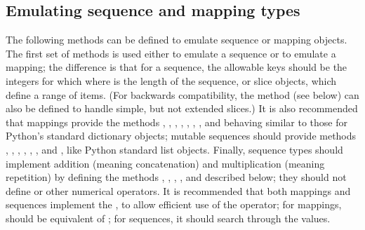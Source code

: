\subsection{Emulating sequence and mapping types\label{sequence-types}}

The following methods can be defined to emulate sequence or mapping
objects.  The first set of methods is used either to emulate a
sequence or to emulate a mapping; the difference is that for a
sequence, the allowable keys should be the integers  for which
 where  is the length of the
sequence, or slice objects, which define a range of items. (For backwards
compatibility, the method  (see below) can also be
defined to handle simple, but not extended slices.) It is also recommended
that mappings provide the methods , ,
, , , ,
, and  behaving similar to those for
Python's standard dictionary objects; mutable sequences should provide
methods , , ,
, , , 
and , like Python standard list objects.  Finally,
sequence types should implement addition (meaning concatenation) and
multiplication (meaning repetition) by defining the methods
, , ,
,  and  described
below; they should not define  or other numerical
operators.  It is recommended that both mappings and sequences
implement the , to allow efficient use of the
 operator; for mappings,  should be equivalent of
; for sequences, it should search through the values.

